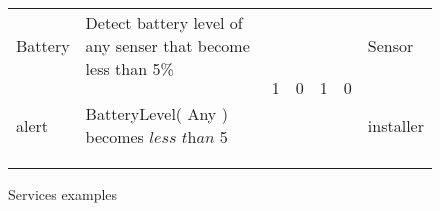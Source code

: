 \begin{figure*}[h]
\begin{tabular}{|p{1.45cm}|p{8cm}|c|c|c|c|p{1.65cm}|}
    \hline
    Battery & \cellcolor{gray!15} Detect battery level of any senser that become less than 5\% & \multirow{2}{*}{1} & \multirow{2}{*}{0} & \multirow{2}{*}{1} & \multirow{2}{*}{0} & Sensor\\ %
    alert & \begin{mtext}
      BatteryLevel( Any ) becomes $\textit{less than}$ 5 
      \end{mtext}& & & && installer\\
    \hline
  \end{tabular}
  \caption{Services examples}
  \label{app_examples}
\end{figure*}
